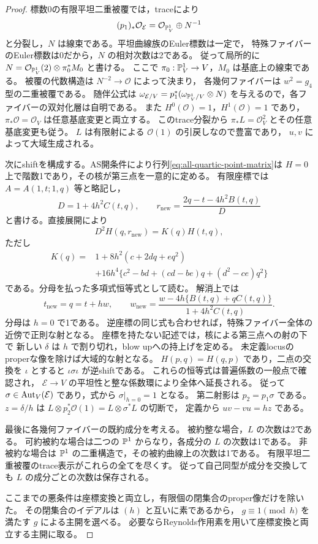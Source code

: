 \begin{proof}
標数0の有限平坦二重被覆では，traceにより
\[
 (p_1)_*\mathcal O_{\mathcal E}
       =\mathcal O_{\mathbb P^1_V}\oplus N^{-1}
\]
と分裂し，$N$ は線束である。平坦曲線族のEuler標数は一定で，
特殊ファイバーのEuler標数は0だから，$N$ の相対次数は2である。
従って局所的に $N=\mathcal O_{\mathbb P^1_V}(2)\otimes\pi_0^*M_0$ と書ける。
ここで $\pi_0:\mathbb P^1_V\to V$，$M_0$ は基底上の線束である。
被覆の代数構造は $N^{-2}\to\mathcal O$ によって決まり，
各幾何ファイバーは $w^2=g_4$ 型の二重被覆である。
随伴公式は
$\omega_{\mathcal E/V}=p_1^*(\omega_{\mathbb P^1_V/V}\otimes N)$
を与えるので，各ファイバーの双対化層は自明である。
また $H^0(\mathcal O)=1$，$H^1(\mathcal O)=1$ であり，
$\pi_*\mathcal O=\mathcal O_V$ は任意基底変更と両立する。
このtrace分裂から $\pi_*L=\mathcal O_V^2$ とその任意基底変更も従う。
$L$ は有限射による $\mathcal O(1)$ の引戻しなので豊富であり，
$u,v$ によって大域生成される。

次にshiftを構成する。AS開条件により行列\eqref{eq:all-quartic-point-matrix}は
$H=0$ 上で階数1であり，その核が第三点を一意的に定める。
有限座標では $A=A(1,t;1,q)$ 等と略記し，
\[
 D=1+4h^2C(t,q),\qquad
 r_{\mathrm{new}}=\frac{2q-t-4h^2B(t,q)}{D}
\]
と書ける。直接展開により
\begin{equation}\label{eq:all-quartic-shift-identity}
 D^2H(q,r_{\mathrm{new}})=K(q)H(t,q),
\end{equation}
ただし
\[
 \begin{split}
 K(q)={}&1+8h^2(c+2dq+eq^2)\\
       &+16h^4\{c^2-bd+(cd-be)q+(d^2-ce)q^2\}
 \end{split}
\]
である。分母を払った多項式恒等式として読む。
解消上では
\begin{equation}\label{eq:all-quartic-regular-shift}
 t_{\mathrm{new}}=q=t+hw,\qquad
 w_{\mathrm{new}}=
 \frac{w-4h\{B(t,q)+qC(t,q)\}}{1+4h^2C(t,q)}.
\end{equation}
分母は $h=0$ で1である。
逆座標の同じ式も合わせれば，特殊ファイバー全体の近傍で正則な射となる。
座標を持たない記述では，核による第三点への射の下で
新しい $\delta$ は $h$ で割り切れ，blow upへの持上げを定める。
未定義locusのproperな像を除けば大域的な射となる。
$H(p,q)=H(q,p)$ であり，二点の交換を $\iota$ とすると
$\iota\sigma\iota$ が逆shiftである。
これらの恒等式は普遍係数の一般点で確認され，
$\mathcal E\to V$ の平坦性と整な係数環により全体へ延長される。
従って $\sigma\in\operatorname{Aut}_V(\mathcal E)$ であり，式から $\sigma|_{h=0}=1$ となる。
第二射影は $p_2=p_1\sigma$ である。
$z=\delta/h$ は $L\otimes p_2^*\mathcal O(1)=L\otimes\sigma^*L$ の切断で，
定義から $uv-vu=hz$ である。

最後に各幾何ファイバーの既約成分を考える。
被約整な場合，$L$ の次数は2である。
可約被約な場合は二つの $\mathbb P^1$ からなり，各成分の $L$ の次数は1である。
非被約な場合は $\mathbb P^1$ の二重構造で，その被約曲線上の次数は1である。
有限平坦二重被覆のtrace表示がこれらの全てを尽くす。
従って自己同型が成分を交換しても $L$ の成分ごとの次数は保存される。

ここまでの悪条件は座標変換と両立し，有限個の閉集合のproper像だけを除いた。
その閉集合のイデアルは $(h)$ と互いに素であるから，
$g\equiv1\pmod h$ を満たす $g$ による主開を選べる。
必要ならReynolds作用素を用いて座標変換と両立する主開に取る。
\end{proof}

